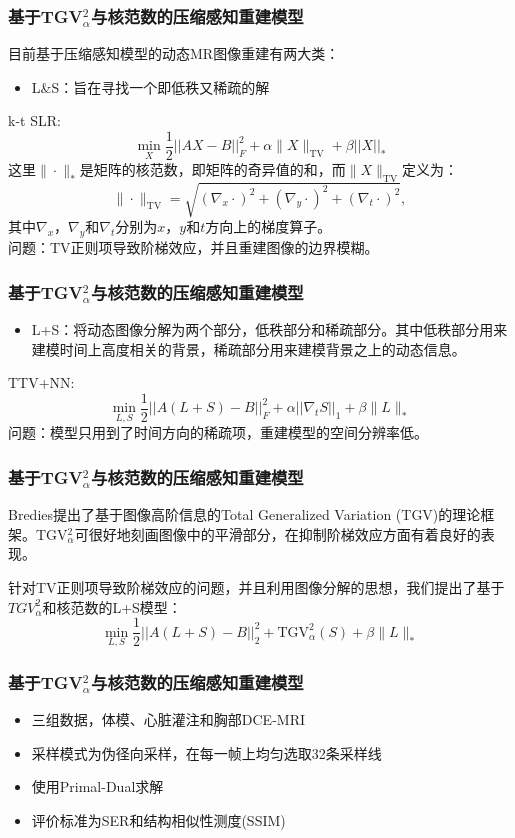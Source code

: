 \documentclass{beamer}
\begin{document}
\begin{frame}
	\frametitle{基于TGV$_\alpha^2$与核范数的压缩感知重建模型}
	目前基于压缩感知模型的动态MR图像重建有两大类：
	\begin{itemize}
		\item L\&S：旨在寻找一个即低秩又稀疏的解		
	\end{itemize}
	k-t SLR:
		\begin{equation}
	\min_X \frac{1}{2}||AX-B||^2_F+\alpha\|X\|_{\mathrm{TV}}+\beta||X||_*
	\end{equation}
	这里$\|\cdot\|_*$是矩阵的核范数，即矩阵的奇异值的和，而$\|X\|_{\mathrm{TV}}$定义为：
\begin{equation*}
\|\cdot\|_\mathrm{TV} = \sqrt{(\nabla_x \cdot)^2 + (\nabla_y \cdot)^2+(\nabla_t \cdot)^2},
\end{equation*}
其中$\nabla_x$，$\nabla_y$和$\nabla_t$分别为$x$，$y$和$t$方向上的梯度算子。\\
	问题：TV正则项导致阶梯效应，并且重建图像的边界模糊。	
\end{frame}

\begin{frame}
	\frametitle{基于TGV$_\alpha^2$与核范数的压缩感知重建模型}
	\begin{itemize}
	\item L+S：将动态图像分解为两个部分，低秩部分和稀疏部分。其中低秩部分用来建模时间上高度相关的背景，稀疏部分用来建模背景之上的动态信息。
    \end{itemize}
		TTV+NN:
		\begin{equation}
	\min_{L,S}\frac{1}{2}||A(L+S)-B||_F^2 + \alpha||\nabla_tS||_1 + \beta\|L\|_*
	\end{equation}	
	问题：模型只用到了时间方向的稀疏项，重建模型的空间分辨率低。
\end{frame}

\begin{frame}
	\frametitle{基于TGV$_\alpha^2$与核范数的压缩感知重建模型}
	Bredies提出了基于图像高阶信息的Total Generalized Variation (TGV)的理论框架。TGV$_\alpha^2$可很好地刻画图像中的平滑部分，在抑制阶梯效应方面有着良好的表现。
	
	针对TV正则项导致阶梯效应的问题，并且利用图像分解的思想，我们提出了基于$TGV_\alpha^2$和核范数的L+S模型：
	\begin{equation}
	\min_{L,S}\frac{1}{2}||A(L+S)-B||_2^2 + \mathrm{TGV}_\alpha^2(S) + \beta\|L\|_*
	\label{equ:tgvlr}
\end{equation}
\end{frame}

\begin{frame}
	\frametitle{基于TGV$_\alpha^2$与核范数的压缩感知重建模型}
	\begin{itemize}
		\item 三组数据，体模、心脏灌注和胸部DCE-MRI
		\item 采样模式为伪径向采样，在每一帧上均匀选取32条采样线
		\item 使用Primal-Dual求解
		\item 评价标准为SER和结构相似性测度(SSIM)
	\end{itemize}
\end{frame}
\end{document}
